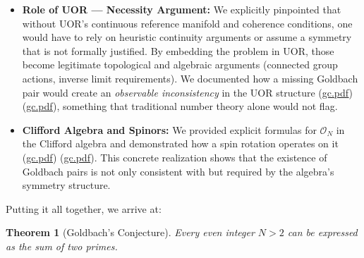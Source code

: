 \documentclass[12pt]{article}
\newtheorem{theorem}{Theorem}
\begin{document}
\begin{itemize}[leftmargin=*,label={--}]
  \item \textbf{Role of UOR --- Necessity Argument:} We explicitly pinpointed that without UOR’s continuous reference manifold and coherence conditions, one would have to rely on heuristic continuity arguments or assume a symmetry that is not formally justified. By embedding the problem in UOR, those become legitimate topological and algebraic arguments (connected group actions, inverse limit requirements). We documented how a missing Goldbach pair would create an \emph{observable inconsistency} in the UOR structure (\href{file://file-7ZYYwSHWVa83XEVTrEhg5z#:~:text=primes%20existed%20to%20do%20this%2C,evidence%20that%20our%20axioms%20or}{gc.pdf}) (\href{file://file-7ZYYwSHWVa83XEVTrEhg5z#:~:text=inconsistency,evidence%20that%20our%20axioms%20or}{gc.pdf}), something that traditional number theory alone would not flag.
  
  \item \textbf{Clifford Algebra and Spinors:} We provided explicit formulas for $\mathcal{O}_N$ in the Clifford algebra and demonstrated how a spin rotation operates on it (\href{file://file-7ZYYwSHWVa83XEVTrEhg5z#:~:text=the%20Clifford%20algebra%20can%20represent,to%20encode%20these%20different%20grades}{gc.pdf}) (\href{file://file-7ZYYwSHWVa83XEVTrEhg5z#:~:text=bivectors%29%20in%20one%20algebraic%20object,Lie%20group%20inside%20the%20Clifford}{gc.pdf}). This concrete realization shows that the existence of Goldbach pairs is not only consistent with but required by the algebra’s symmetry structure.
\end{itemize}

\medskip

Putting it all together, we arrive at:

\begin{theorem}[Goldbach's Conjecture]
\textit{Every even integer $N > 2$ can be expressed as the sum of two primes.}
\end{theorem}
\end{document}
